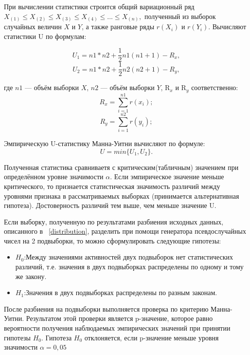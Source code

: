 При вычислении статистики строится общий вариационный ряд $ X_{(1)} \leq X_{(2)} \leq X_{(3)} \leq X_{(4)} \leq ... \leq X_{(n)}, $ полученный из выборок случайных величин $X$ и $Y$, а также ранговые ряды $r(X_{i})$ и $r(Y_{i})$. Вычисляют статистики U по формулам:

\begin{equation} 
	U_{1} = n1*n2 + \frac{1}{2}n1(n1+1) - R_{x},
\end{equation}
\begin{equation}
	U_{2} = n1*n2 + \frac{1}{2}n2(n2+1) - R_{y},
\end{equation}

где $n1$ --- объём выборки $X$, $n2$ --- объём выборки $Y$, R$_{x}$ и R$_{y}$ соответственно:
\begin{equation} 
	R_{x} = \sum_{i=1}^{n1}r(x_{i});
\end{equation}
\begin{equation} 
	R_{y} = \sum_{i=1}^{n2}r(y_{i});
\end{equation}

Эмпирическую U-статистику Манна-Уитни вычисляют по формуле:
\begin{equation} 
	U = min\{U_{1},U_{2}\}.
\end{equation}

Полученная статистика сравниваетя с критическим(табличным) значением при определённом уровне значимости $\alpha$. Если эмпирическое значение меньше критического, то признается статистическая значимость различий между уровнями признака в рассматриваемых выборках (принимается альтернативная гипотеза). Достоверность различий тем выше, чем меньше значение U.

Если выборку, полученную по результатами разбиения исходных данных, описанного в ~\ref{distribution}, разделить при помощи генератора псевдослучайных чисел на 2 подвыборки, то можно сформулировать следующие гипотезы:
\begin{itemize}
	\item $H_{0}$:Между значениями активностей двух подвыборок нет статистических различий, т.е. значения в двух подвыборках распределены по одному и тому же закону.
	\item $H_{1}$:Значения в двух подвыборках распределены по разным законам.
\end{itemize}

После разбиения на подвыборки выполняется проверка по критерию Манна-Уитни. Результатом этой проверки является p-значение, которое равно вероятности получения наблюдаемых эмпирических значений при принятии гипотезы $H_{0}$. Гипотеза $H_{0}$ отклоняется, если p-значение меньше уровня значимости $\alpha = 0,05$

